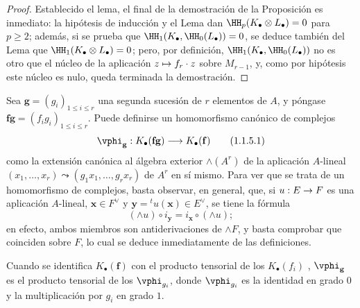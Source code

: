 \documentclass[oneside]{amsart}
\makeatletter
\renewcommand{\leq}{\leqslant}
\renewcommand{\geq}{\geqslant}
\providecommand{\dual}{}\renewcommand{\dual}[1]{{#1}^{\vee}}
\newcommand{\ega@arrow}[2]{\mathchoice{#1}{#2}{#2}{#2}}
\let\ega@shortmapsto\mapsto
\renewcommand{\to}{\ega@arrow{\longrightarrow}{\rightarrow}}
\renewcommand{\mapsto}{\ega@arrow{\longmapsto}{\ega@shortmapsto}}
\let\EGAOriginalLabel\label
\renewcommand{\label}[1]{\phantomsection\EGAOriginalLabel{#1}}
\makeatother
\begin{document}
\begin{proof}
Establecido el lema, el final de la demostración de la Proposición  es inmediato: la hipótesis de inducción y el Lema  dan $\HH_p(K_\bullet\otimes L_\bullet)=0$ para $p\geq 2$; además, si se prueba que $\HH_1(K_\bullet,\HH_0(L_\bullet))=0$, se deduce también del Lema  que $\HH_1(K_\bullet\otimes L_\bullet)=0$; pero, por definición, $\HH_1(K_\bullet,\HH_0(L_\bullet))$ no es otro que el núcleo de la aplicación $z\mapsto f_r\cdot z$ sobre $M_{r-1}$, y, como por hipótesis este núcleo es nulo, queda terminada la demostración.
\end{proof}

\begin{env}[1.1.5]
\label{III.1.1.5}
Sea $\mathbf{g}=(g_i)_{1\leq i\leq r}$ una segunda sucesión de $r$ elementos de $A$, y póngase $\mathbf{f}\mathbf{g}=(f_i g_i)_{1\leq i\leq r}$.
Puede definirse un homomorfismo canónico de complejos
\[
  \vphi_\mathbf{g}:K_\bullet(\mathbf{f}\mathbf{g})\to K_\bullet(\mathbf{f})
  \tag{1.1.5.1}
\]
como la extensión canónica al álgebra exterior $\wedge(A^r)$ de la aplicación $A$-lineal $(x_1,\dots,x_r)\leadsto(g_1 x_1,\dots,g_r x_r)$ de $A^r$ en sí mismo.
Para ver que se trata de un homomorfismo de complejos, basta observar, en general, que, si $u:E\to F$ es una aplicación $A$-lineal, $\mathbf{x}\in\dual{F}$ y $\mathbf{y}={}^t u(\mathbf{x})\in\dual{E}$, se tiene la fórmula
\[
  (\wedge u)\circ i_\mathbf{y}=i_\mathbf{x}\circ(\wedge u);
  \tag{1.1.5.2}
\]
en efecto, ambos miembros son antiderivaciones de $\wedge F$, y basta comprobar que coinciden sobre $F$, lo cual se deduce inmediatamente de las definiciones.

Cuando se identifica $K_\bullet(\mathbf{f})$ con el producto tensorial de los $K_\bullet(f_i)$ , $\vphi_\mathbf{g}$ es el producto tensorial de los $\vphi_{g_i}$, donde $\vphi_{g_i}$ es la identidad en grado $0$ y la multiplicación por $g_i$ en grado $1$.
\end{env}
\end{document}

